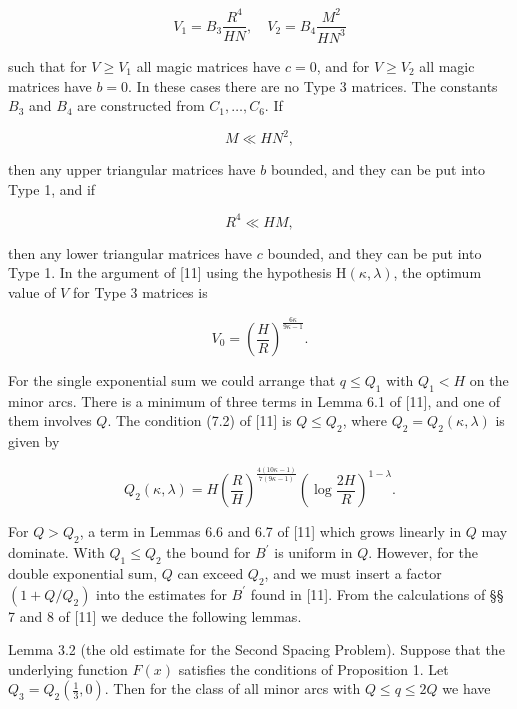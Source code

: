 \documentclass[10pt]{article}
\begin{document}
\begin{equation*}
V_{1}=B_{3} \frac{R^{4}}{H N}, \quad V_{2}=B_{4} \frac{M^{2}}{H N^{3}} \tag{3.5}
\end{equation*}


such that for $V \geqslant V_{1}$ all magic matrices have $c=0$, and for $V \geqslant V_{2}$ all magic matrices have $b=0$. In these cases there are no Type 3 matrices. The constants $B_{3}$ and $B_{4}$ are constructed from $C_{1}, \ldots, C_{6}$. If


\begin{equation*}
M \ll H N^{2}, \tag{3.6}
\end{equation*}


then any upper triangular matrices have $b$ bounded, and they can be put into Type 1, and if


\begin{equation*}
R^{4} \ll H M, \tag{3.7}
\end{equation*}


then any lower triangular matrices have $c$ bounded, and they can be put into Type 1. In the argument of [11] using the hypothesis $\mathrm{H}(\kappa, \lambda)$, the optimum value of $V$ for Type 3 matrices is


\begin{equation*}
V_{0}=\left(\frac{H}{R}\right)^{\frac{6 \kappa}{9 \kappa-1}}. \tag{3.8}
\end{equation*}


For the single exponential sum we could arrange that $q \leqslant Q_{1}$ with $Q_{1}<H$ on the minor arcs. There is a minimum of three terms in Lemma 6.1 of [11], and one of them involves $Q$. The condition (7.2) of [11] is $Q \leqslant Q_{2}$, where $Q_{2}=Q_{2}(\kappa, \lambda)$ is given by


\begin{equation*}
Q_{2}(\kappa, \lambda)=H\left(\frac{R}{H}\right)^{\frac{4(10 \kappa-1)}{7(9 \kappa-1)}}\left(\log \frac{2 H}{R}\right)^{1-\lambda}. \tag{3.9}
\end{equation*}


For $Q>Q_{2}$, a term in Lemmas 6.6 and 6.7 of [11] which grows linearly in $Q$ may dominate. With $Q_{1} \leqslant Q_{2}$ the bound for $B^{\prime}$ is uniform in $Q$. However, for the double exponential sum, $Q$ can exceed $Q_{2}$, and we must insert a factor $\left(1+Q / Q_{2}\right)$ into the estimates for $B^{\prime}$ found in [11]. From the calculations of §§ 7 and 8 of [11] we deduce the following lemmas.

Lemma 3.2 (the old estimate for the Second Spacing Problem). Suppose that the underlying function $F(x)$ satisfies the conditions of Proposition 1. Let $Q_{3}=Q_{2}\left(\frac{1}{3}, 0\right)$. Then for the class of all minor arcs with $Q \leqslant q \leqslant 2 Q$ we have
\end{document}
